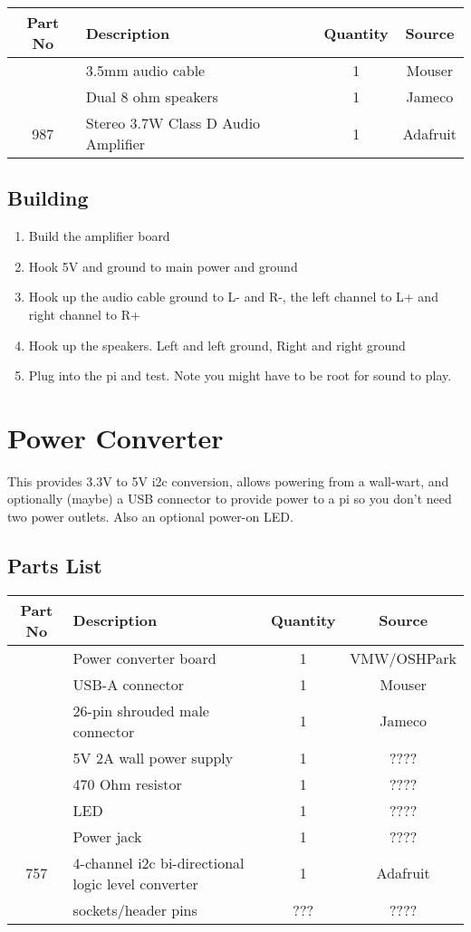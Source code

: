 \documentclass[11pt]{article}
\begin{document}
\begin{tabular}{|c|l|c|c|}
\hline
Part No	&  Description			&  Quantity	& Source \\
\hline
\hline
	& 3.5mm audio cable		& 1		& Mouser \\
\hline
	& Dual 8 ohm speakers		& 1		& Jameco \\
\hline
987	& Stereo 3.7W Class D Audio Amplifier & 1	& Adafruit \\ %
\hline
\end{tabular}

\subsection{Building}

\begin{enumerate}
\item Build the amplifier board
\item Hook 5V and ground to main power and ground
\item Hook up the audio cable ground to L- and R-,
	the left channel to L+ and right channel to R+
\item Hook up the speakers.  Left and left ground, Right and right ground
\item Plug into the pi and test.  Note you might have to be root
	for sound to play.
\end{enumerate}


\pagebreak
\section{Power Converter}

This provides 3.3V to 5V i2c conversion, allows powering from
a wall-wart, and optionally (maybe) a USB connector to provide
power to a pi so you don't need two power outlets.
Also an optional power-on LED.

\subsection{Parts List}

\begin{tabular}{|c|l|c|c|}
\hline
Part No	&  Description			&  Quantity	& Source \\
\hline
\hline
	& Power converter board		& 1		& VMW/OSHPark\\
\hline
	& USB-A connector		& 1		& Mouser \\
\hline
	& 26-pin shrouded male connector& 1		& Jameco \\
\hline
	& 5V 2A wall power supply	& 1		& ???? \\
\hline
	& 470 Ohm resistor		& 1		& ???? \\
\hline
	& LED				& 1		& ???? \\
\hline 
	& Power jack			& 1		& ???? \\
\hline
757	& 4-channel i2c bi-directional logic level converter & 1	& Adafruit \\ %
\hline
	& sockets/header pins		& ???		& ???? \\
\hline
\end{tabular}
\end{document}
